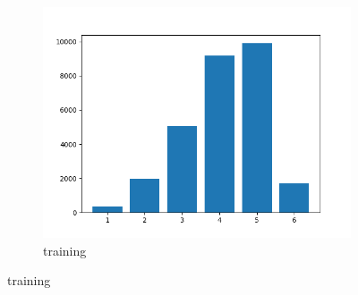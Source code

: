 \documentclass{report}
\begin{document}
\begin{figure}[h!]
\begin{subfigure}{.33\textwidth}
	\includegraphics[width=1\linewidth]{img/train_ratings}
	\caption{training}
	\label{fig:trainratings}
	\end{subfigure}
\end{figure}
\end{document}
